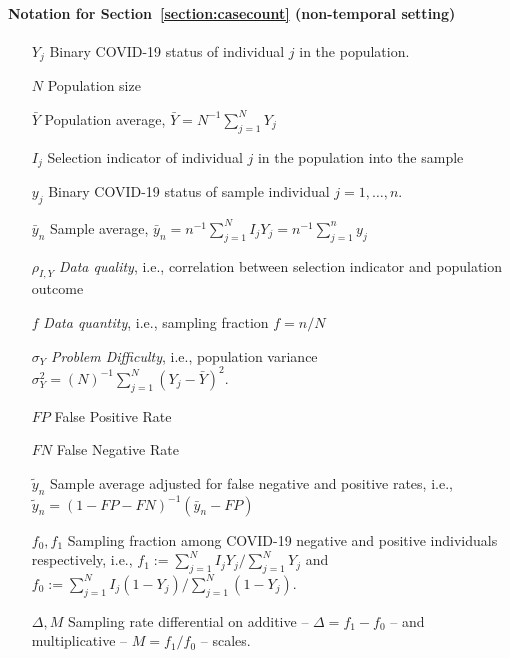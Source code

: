 \documentclass[12pt]{amsart}
\numberwithin{equation}{section}
\theoremstyle{plain}
\begin{document}
\paragraph{Notation for Section~\ref{section:casecount} (non-temporal setting)}
\begin{itemize}
\item[$Y_j$] \quad Binary COVID-19 status of individual $j$ in the population.
\item[$N$] \quad Population size
\item[$\bar Y$] \quad Population average, $\bar Y = N^{-1} \sum_{j=1}^N Y_j$
\item[$I_j$] \quad Selection indicator of individual $j$ in the population into the sample
\item[$y_j$] \quad Binary COVID-19 status of sample individual $j=1,\ldots,n$.
\item[$\bar y_n$] \quad Sample average, $\bar y_n = n^{-1} \sum_{j=1}^N I_j Y_j = n^{-1} \sum_{j=1}^n y_j$
\item[$\rho_{I,Y}$] \quad \emph{Data quality}, i.e., correlation between selection indicator and population outcome
\item[$f$] \quad \emph{Data quantity}, i.e., sampling fraction $f = n/N$
\item[$\sigma_Y$] \quad \emph{Problem Difficulty}, i.e., population variance $\sigma_Y^2 = (N)^{-1} \sum_{j=1}^N (Y_j - \bar Y)^2$.
\item[$FP$] \quad False Positive Rate
\item[$FN$] \quad False Negative Rate
\item[$\tilde y_n$] \quad Sample average adjusted for false negative and positive rates, i.e., $\tilde y_n = (1-FP-FN)^{-1} (\bar y_n - FP)$
\item[$f_0, f_1$] \quad Sampling fraction among COVID-19 negative and positive individuals respectively, i.e., $f_1 := \sum_{j=1}^N I_j Y_j / \sum_{j=1}^N Y_j$
and $f_0 := \sum_{j=1}^N I_j (1-Y_j) / \sum_{j=1}^N (1-Y_j)$.
\item[$\Delta, M$] \quad Sampling rate differential on additive -- $\Delta = f_1 - f_0$ -- and multiplicative -- $M = f_1/f_0$ -- scales.
\end{itemize}
\end{document}
